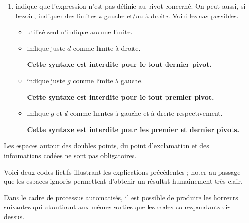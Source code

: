 \documentclass[10pt, a4paper]{article}
\begin{document}
\begin{enumerate}
\begin{itemize}
\begin{enumerate}
            \item \tdocinlatex{!} indique que
l'expression n'est pas définie au pivot concerné.
            On peut aussi, si besoin, indiquer des limites à gauche et/ou à droite. Voici les cas possibles.
            \begin{itemize}
                \item \tdocinlatex{!} utilisé seul n'indique aucune limite.


                \item  {} indique juste $d$ comme limite à droite.

                \textbf{Cette syntaxe est interdite pour le tout dernier pivot.}


                \item {} indique juste $g$ comme limite à gauche.

                \textbf{Cette syntaxe est interdite pour le tout premier pivot.}


                \item  {} indique $g$ et $d$ comme limites à gauche et à droite respectivement.

                \textbf{Cette syntaxe est interdite pour les premier et dernier pivots.}
            \end{itemize}
        \end{enumerate}
    \end{itemize}
\end{enumerate}








\begin{tdocnote}
    Les espaces autour des doubles points, du point d'exclamation et des informations codées ne sont pas obligatoires.
\end{tdocnote}




Voici deux codes fictifs illustrant les explications précédentes ; noter au passage que les espaces ignorés permettent d'obtenir un résultat humainement très clair.
\begin{multicols}{2}

\end{multicols}

Dans le cadre de processus automatisés, il est possible de produire les horreurs suivantes qui aboutiront aux mêmes sorties que les codes correspondants ci-dessus.
\begin{multicols}{2}

\end{multicols}
\end{document}
